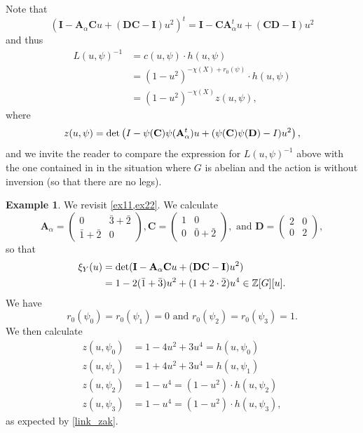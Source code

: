 \documentclass[11pt]{amsart}
\numberwithin{equation}{section}
\theoremstyle{remark}
\theoremstyle{definition}
\newtheorem{example}[theorem]{Example}
\begin{document}
Note that
$$(\mathbf{I} - \mathbf{A}_{\alpha}\mathbf{C}u + (\mathbf{D}\mathbf{C}-\mathbf{I})u^{2})^{t} = \mathbf{I} - \mathbf{C}\mathbf{A}_{\alpha}^{t}u + (\mathbf{C}\mathbf{D}-\mathbf{I})u^{2} $$
and thus 
\begin{equation*}
\begin{aligned}
L(u,\psi)^{-1} &= c(u,\psi) \cdot h(u,\psi) \\
&= (1-u^{2})^{-\chi(X) + r_{0}(\psi)} \cdot h(u,\psi) \\
&= (1-u^{2})^{-\chi(X)}z(u,\psi),
\end{aligned}
\end{equation*}
where 
$$z(u,\psi) = {\rm det}\left( I - \psi(\mathbf{C})\psi(\mathbf{A}_{\alpha}^{t})u + (\psi(\mathbf{C})\psi(\mathbf{D})-I)u^{2} \right), $$
and we invite the reader to compare the expression for $L(u,\psi)^{-1}$ above with the one contained in \cite[Theorem 4.17]{Zakharov:2021} in the situation where $G$ is abelian and the action is without inversion (so that there are no legs).
\begin{example}
We revisit \cref{ex11,ex22}.  We calculate
\begin{equation*}
\mathbf{A}_{\alpha} = 
\begin{pmatrix}
0 & \bar{3} + \bar{2} \\
\bar{1} + \bar{2} & 0
\end{pmatrix},
\mathbf{C} =
\begin{pmatrix}
1 & 0 \\
0 & \bar{0} + \bar{2}
\end{pmatrix}, \text{ and }
\mathbf{D} =
\begin{pmatrix}
2 & 0 \\
0 & 2
\end{pmatrix},
\end{equation*}
so that
\begin{equation*}
\begin{aligned} 
\xi_{Y}(u) &= {\rm det}(\mathbf{I} - \mathbf{A}_{\alpha}\mathbf{C}u + (\mathbf{D}\mathbf{C} - \mathbf{I})u^{2}) \\
&= 1 -2(\bar{1} + \bar{3})u^{2} + (1 + 2 \cdot \bar{2})u^{4} \in \mathbb{Z}[G][u].
\end{aligned}
\end{equation*}
We have
$$r_{0}(\psi_{0}) = r_{0}(\psi_{1}) = 0 \text{ and } r_{0}(\psi_{2}) = r_{0}(\psi_{3}) = 1. $$
We then calculate
\begin{equation*}
\begin{aligned}
z(u,\psi_{0}) &= 1 - 4u^{2} + 3u^{4} = h(u,\psi_{0}) \\
z(u,\psi_{1}) &= 1 + 4u^{2} + 3u^{4} = h(u,\psi_{1}) \\
z(u,\psi_{2}) &= 1-u^{4} = (1-u^{2}) \cdot h(u,\psi_{2}) \\
z(u,\psi_{3}) &= 1-u^{4} = (1-u^{2}) \cdot h(u,\psi_{3}),
\end{aligned}
\end{equation*}
as expected by \cref{link_zak}.
\end{example}
\end{document}
